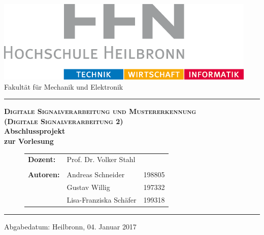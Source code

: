 \thispagestyle{plain}
\begin{titlepage}
\begin{center}
\centering
\includegraphics[scale=2.2]{grafic/logo_hhn_titlepage} \\
\vspace{0.2cm}
\large Fakultät für Mechanik und Elektronik
\vspace{0.5cm}
\hrule

\vspace{2cm}

\LARGE{\textbf{\scshape{Digitale Signalverarbeitung und Mustererkennung}}}\\
\vspace{0.3cm}
\LARGE{\textbf{\scshape{(Digitale Signalverarbeitung 2)}}}\\
\vspace{1.8cm}
\Huge{\textbf{Abschlussprojekt\\zur Vorlesung}} \\
\vfill


\begin{figure}[H]
	\newlength{\myl}
	\settowidth{\myl}{Lecturer:  }
	\hspace{-\myl}
	\centering
	\large
	\begin{tabular}{llr}
		\textbf{Dozent:} & \multicolumn{2}{l}{Prof. Dr. Volker Stahl} \\
		                   &                &  \\
		\textbf{Autoren:}  & Andreas Schneider   & 198805                     \\
		                   & Gustav Willig    & 197332 \\
		                   & Lisa-Franziska Schäfer	& 199318 \\
	\end{tabular}
\end{figure}

\large

\hrule
\normalsize
Abgabedatum: Heilbronn, 04. Januar 2017%

\end{center}


\thispagestyle{empty}
	
\end{titlepage}
